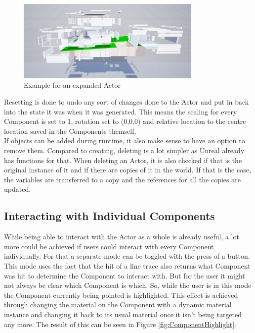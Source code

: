 \begin{figure}[htpb]
	\centering
	\includegraphics[width=0.8\textwidth]{fig/ExpanedActor.png}
	\caption[Example for an expanded Actor]{Example for an expanded Actor\protect}
	\label{fig:ExpanedActor}
\end{figure}

Resetting is done to undo any sort of changes done to the Actor and put in back into the state it was when it was generated. This means the scaling for every Component is set to 1, rotation set to (0,0,0) and relative location to the centre location saved in the Components themself.\\
If objects can be added during runtime, it also make sense to have an option to remove them. Compared to creating, deleting is a lot simpler as Unreal already has functions for that. When deleting an Actor, it is also checked if that is the original instance of it and if there are copies of it in the world. If that is the case, the variables are transferred to a copy and the references for all the copies are updated.\\

\subsection{Interacting with Individual Components}

While being able to interact with the Actor as a whole is already useful, a lot more could be achieved if users could interact with every Component individually. For that a separate mode can be toggled with the press of a button. This mode uses the fact that the hit of a line trace also returns what Component was hit to determine the Component to interact with. But for the user it might not always be clear which Component is which. So, while the user is in this mode the Component currently being pointed is highlighted. This effect is achieved through changing the material on the Component with a dynamic material instance and changing it back to its usual material once it isn't being targeted any more. The result of this can be seen in Figure \ref{fig:ComponentHighlight}.\\

